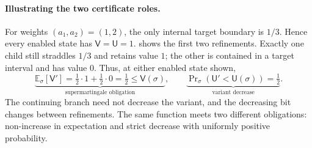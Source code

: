 \paragraph{Illustrating the two certificate roles.}
For weights $(a_1,a_2)=(1,2)$, the only internal target boundary is
$1/3$.  Hence every enabled state has $\mathsf V=\mathsf U=1$.
 shows the first two refinements.
Exactly one child still straddles $1/3$ and retains value $1$; the
other is contained in a target interval and has value $0$.
Thus, at either enabled state shown,
\[
 \underbrace{\mathbb E_\sigma[\mathsf V']
 =\tfrac12\cdot1+\tfrac12\cdot0
 =\tfrac12\le\mathsf V(\sigma)}_{\text{supermartingale obligation}},
 \qquad
 \underbrace{\Pr\nolimits_\sigma\!\left(\mathsf U'<\mathsf U(\sigma)\right)
 =\tfrac12}_{\text{variant decrease}}.
\]
The continuing branch need not decrease the variant, and the decreasing
bit changes between refinements. The same function meets two different
obligations: non-increase in expectation and strict decrease with
uniformly positive probability.

